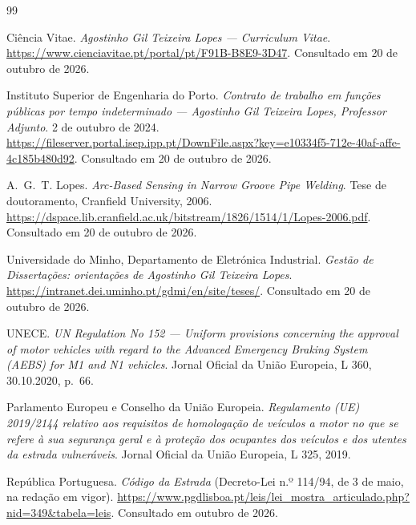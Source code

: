 \clearpage
{}
{}
\begin{thebibliography}{99}
\small\raggedright
\setlength{\itemsep}{3pt}

 Ciência Vitae. \emph{Agostinho Gil Teixeira Lopes --- Curriculum Vitae}.
\url{https://www.cienciavitae.pt/portal/pt/F91B-B8E9-3D47}. Consultado em 20 de outubro de 2026.

 Instituto Superior de Engenharia do Porto. \emph{Contrato de trabalho em
funções públicas por tempo indeterminado --- Agostinho Gil Teixeira Lopes, Professor Adjunto}. 2 de
outubro de 2024.
\url{https://fileserver.portal.isep.ipp.pt/DownFile.aspx?key=e10334f5-712e-40af-affe-4c185b480d92}.
Consultado em 20 de outubro de 2026.

 A.~G.~T. Lopes. \emph{Arc-Based Sensing in Narrow Groove Pipe Welding}. Tese de
doutoramento, Cranfield University, 2006.
\url{https://dspace.lib.cranfield.ac.uk/bitstream/1826/1514/1/Lopes-2006.pdf}. Consultado em 20 de
outubro de 2026.

 Universidade do Minho, Departamento de Eletrónica Industrial. \emph{Gestão de
Dissertações: orientações de Agostinho Gil Teixeira Lopes}.
\url{https://intranet.dei.uminho.pt/gdmi/en/site/teses/}. Consultado em 20 de outubro de 2026.

 UNECE. \emph{UN Regulation No 152 --- Uniform provisions concerning the approval
of motor vehicles with regard to the Advanced Emergency Braking System (AEBS) for M1 and N1
vehicles}. Jornal Oficial da União Europeia, L 360, 30.10.2020, p.~66.

 Parlamento Europeu e Conselho da União Europeia. \emph{Regulamento (UE) 2019/2144
relativo aos requisitos de homologação de veículos a motor no que se refere à sua segurança geral e
à proteção dos ocupantes dos veículos e dos utentes da estrada vulneráveis}. Jornal Oficial da
União Europeia, L 325, 2019.

 República Portuguesa. \emph{Código da Estrada} (Decreto-Lei n.º 114/94, de 3
de maio, na redação em vigor).
\url{https://www.pgdlisboa.pt/leis/lei_mostra_articulado.php?nid=349&tabela=leis}. Consultado em
outubro de 2026.


\end{thebibliography}
